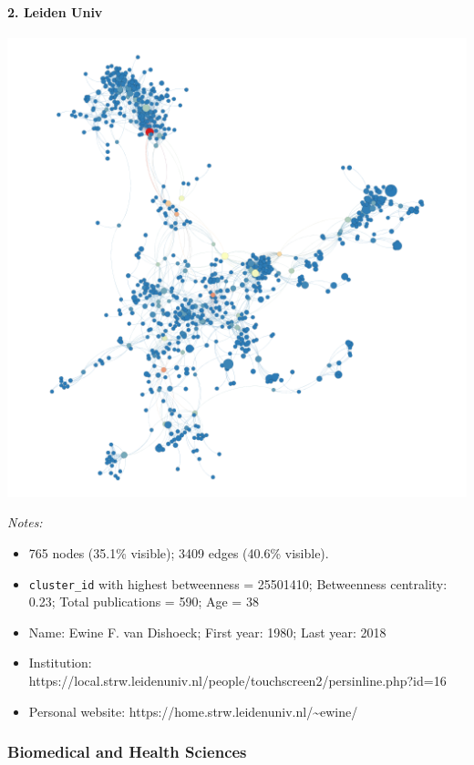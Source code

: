\documentclass[]{elsarticle} %
\makeatletter
\providecommand{\tightlist}{%
  \setlength{\itemsep}{0pt}\setlength{\parskip}{0pt}}
\def\maxwidth{\ifdim\Gin@nat@width>\linewidth\linewidth
\else\Gin@nat@width\fi}
\let\Oldincludegraphics\includegraphics
\renewcommand{\includegraphics}[1]{\Oldincludegraphics[width=\maxwidth]{#1}}
\makeatother
\begin{document}
\hypertarget{leiden-univ}{%
\paragraph{2. Leiden Univ}\label{leiden-univ}}

\includegraphics{figs/lu_phys_betweenness.png}

\emph{Notes:}

\begin{itemize}
\tightlist
\item
  765 nodes (35.1\% visible); 3409 edges (40.6\% visible).
\item
  \texttt{cluster\_id} with highest betweenness = 25501410; Betweenness
  centrality: 0.23; Total publications = 590; Age = 38
\item
  Name: Ewine F. van Dishoeck; First year: 1980; Last year: 2018
\item
  Institution:
  https://local.strw.leidenuniv.nl/people/touchscreen2/persinline.php?id=16
\item
  Personal website:
  https://home.strw.leidenuniv.nl/\textasciitilde{}ewine/
\end{itemize}

\hypertarget{biomedical-and-health-sciences}{%
\subsubsection{Biomedical and Health
Sciences}\label{biomedical-and-health-sciences}}
\end{document}
